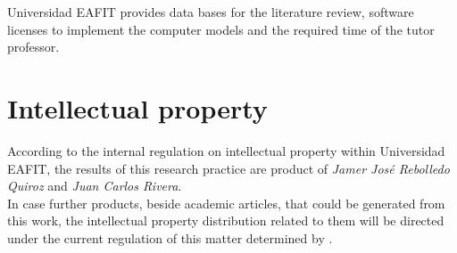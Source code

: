 \documentclass[11pt,letterpaper]{article}
\begin{document}
Universidad EAFIT provides data bases for the literature review, software licenses to implement the computer models and the required time of the tutor professor.


\section{Intellectual property}

According to the internal regulation on intellectual property within Universidad EAFIT, the results of this research practice are product of \emph{Jamer José Rebolledo Quiroz} and \emph{Juan Carlos Rivera}.\\

In case further products, beside academic articles, that could be generated from this work, the intellectual property distribution related to them will be directed under the current regulation of this matter determined by \cite{reglamento2017}.




\end{document}
